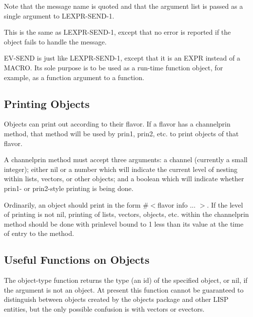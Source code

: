 Note that the message name is quoted and that  the  argument
    list is passed as a single argument to LEXPR-SEND-1.

{   This  is  the  same as LEXPR-SEND-1, except that no error is
    reported if the object fails to handle the message.
}

{    EV-SEND is just like LEXPR-SEND-1, except that it is an EXPR
    instead of a MACRO.  Its sole purpose is to  be  used  as  a
    run-time   function  object,  for  example,  as  a  function
    argument to a function.
}
\subsection{Printing Objects}

  Objects can print out according to their flavor.  If a  flavor
has  a  channelprin  method,  that method will be used by prin1,
prin2, etc. to print objects of that flavor.

{    A channelprin method must accept three arguments: a  channel
    (currently  a  small  integer); either nil or a number which
    will indicate the current level  of  nesting  within  lists,
    vectors, or other objects; and a boolean which will indicate
    whether prin1- or prin2-style printing is being done.
}

    Ordinarily, an object should print in the form \#$<$flavor info
    ...   $>$. If the level of printing is not nil, printing of
    lists, vectors, objects, etc. within the channelprin  method
    should be done with prinlevel bound to 1 less than its value
    at the time of entry to the method.

\subsection{Useful Functions on Objects}

{
    The  object-type  function  returns  the type (an id) of the
    specified object, or nil, if the argument is not an  object.
    At present this function cannot be guaranteed to distinguish
    between  objects  created  by  the objects package and other
    LISP entities, but  the  only  possible  confusion  is  with
    vectors or evectors.
}



